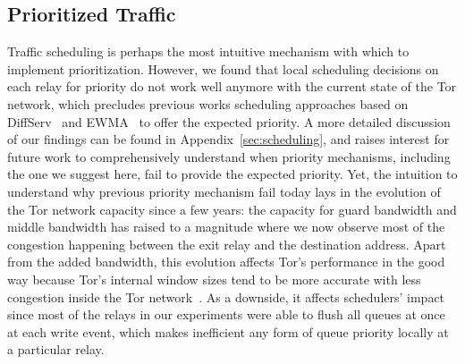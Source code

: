 \subsection{Prioritized Traffic}
\label{subsub:prioritized}

Traffic scheduling is
perhaps the most intuitive mechanism with which to implement
prioritization. However, we found that local scheduling decisions on each relay for priority do not work well anymore with the current state of the Tor network, which precludes previous works scheduling approaches based on DiffServ~\cite{dovrolis1999case} and EWMA~\cite{tang2010improved} to offer the expected priority. A more detailed
discussion of our findings can be found in Appendix~\ref{sec:scheduling}, and raises interest for future work to comprehensively understand when priority mechanisms, including the one we suggest here, fail to provide the expected priority. Yet, the intuition to understand why previous priority mechanism fail today lays in the evolution of the Tor network capacity since a few years: the capacity for guard bandwidth and middle bandwidth has raised to a magnitude where we now observe most of the congestion happening between the exit relay and the destination address. Apart from the added bandwidth, this evolution affects Tor's performance in the good way because Tor's internal window sizes tend to be more accurate with less congestion inside the Tor network~\cite{archive-2009-mail,kiraly2008solving}. As a downside, it affects schedulers' impact since most of the relays in our experiments were able to flush all queues at once at each write event, which makes inefficient any form of queue priority locally at a particular relay.

